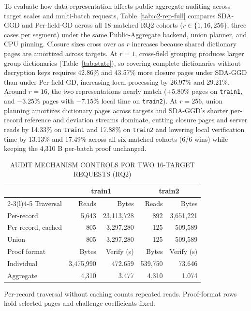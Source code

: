 \documentclass[10pt,journal]{IEEEtran}
\newcommand{\tabnote}[1]{\par\smallskip\parbox{\linewidth}{\footnotesize #1}}
\begin{document}
To evaluate how data representation affects public aggregate auditing across target scales and multi-batch requests, Table~\ref{tab:c2-rep-full} compares SDA-GGD and Per-field-GD across all 18 matched RQ2 cohorts ($r\in\{1,16,256\}$, three cases per segment) under the same Public-Aggregate backend, union planner, and CPU pinning. Closure sizes cross over as $r$ increases because shared dictionary pages are amortized across targets. At $r=1$, cross-field grouping produces larger group dictionaries (Table~\ref{tab:state}), so covering complete dictionaries without decryption keys requires 42.86\% and 43.57\% more closure pages under SDA-GGD than under Per-field-GD, increasing local processing by 26.97\% and 29.21\%. Around $r=16$, the two representations nearly match ($+5.80\%$ pages on \texttt{train1}, and $-3.25\%$ pages with $-7.15\%$ local time on \texttt{train2}). At $r=256$, union planning amortizes dictionary pages across targets and SDA-GGD's shorter per-record reference and deviation streams dominate, cutting closure pages and server reads by 14.33\% on \texttt{train1} and 17.88\% on \texttt{train2} and lowering local verification time by 13.13\% and 17.49\% across all six matched cohorts (6/6 wins) while keeping the 4,310 B per-batch proof unchanged.

\begin{table}[t]\centering\small
\caption{AUDIT MECHANISM CONTROLS FOR TWO 16-TARGET REQUESTS (RQ2)}
\label{tab:c2-mechanisms}
\setlength{\tabcolsep}{3.2pt}
\begin{tabular}{@{}lrrrr@{}}\toprule
 & \multicolumn{2}{c}{train1} & \multicolumn{2}{c}{train2}\\
\cmidrule(lr){2-3}\cmidrule(l){4-5}
Traversal & Reads & Bytes & Reads & Bytes\\\midrule
Per-record & 5,643 & 23,113,728 & 892 & 3,651,221\\
Per-record, cached & 805 & 3,297,280 & 125 & 509,589\\
Union & 805 & 3,297,280 & 125 & 509,589\\\midrule
Proof format & Bytes & Verify (s) & Bytes & Verify (s)\\\midrule
Individual & 3,475,990 & 472.659 & 539,750 & 73.646\\
Aggregate & 4,310 & 3.477 & 4,310 & 1.074\\\bottomrule
\end{tabular}
\tabnote{Per-record traversal without caching counts repeated reads. Proof-format rows hold selected pages and challenge coefficients fixed.}
\end{table}
\end{document}
